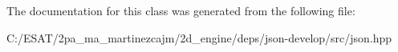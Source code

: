 The documentation for this class was generated from the following file\+:\begin{DoxyCompactItemize}
\item 
C\+:/\+E\+S\+A\+T/2pa\+\_\+ma\+\_\+martinezcajm/2d\+\_\+engine/deps/json-\/develop/src/json.\+hpp\end{DoxyCompactItemize}

